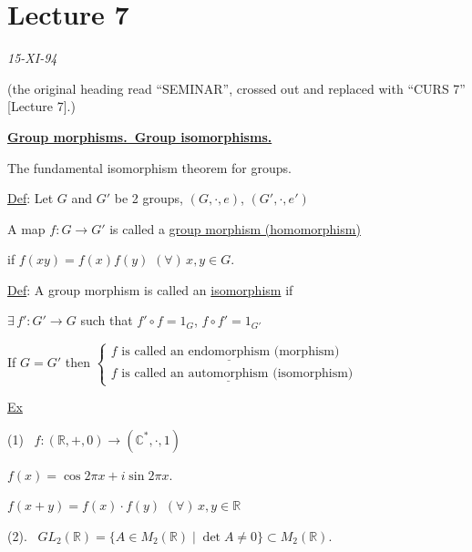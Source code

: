 \bigskip

\section{Lecture 7}



\begin{center}
\end{center}
\begin{flushright}
\textit{15-XI-94}
\end{flushright}
\noindent \footnotesize (the original heading read ``SEMINAR'', crossed out and replaced with ``CURS 7'' [Lecture 7].)\normalsize

\bigskip
\noindent\underline{\textbf{Group morphisms.\ Group isomorphisms.}}

\noindent The fundamental isomorphism theorem for groups.

\bigskip
\noindent\underline{Def}: Let $G$ and $G'$ be 2 groups, $(G,\cdot,e)$, $(G',\cdot,e')$

\noindent A map $f:G\to G'$ is called a \underline{group morphism (homomorphism)}

\noindent if $f(xy)=f(x)f(y)$ $(\forall)\,x,y\in G$.

\bigskip
\noindent\underline{Def}: A group morphism is called an \underline{isomorphism} if

\noindent $\exists\,f':G'\to G$ such that $f'\circ f=1_G$, $f\circ f'=1_{G'}$

\bigskip
\noindent If $G=G'$ then $\begin{cases} f \text{ is called an } \underline{\text{endomorphism}} \text{ (morphism)} \\ f \text{ is called an } \underline{\text{automorphism}} \text{ (isomorphism)}\end{cases}$

\bigskip
\noindent\underline{Ex}

\noindent (1) \ $f:(\mathbb{R},+,0) \to (\mathbb{C}^*,\cdot,1)$

\noindent $f(x) = \cos 2\pi x + i\sin 2\pi x$.

\noindent $f(x+y) = f(x)\cdot f(y)$ $(\forall)\,x,y\in\mathbb{R}$

\bigskip
\noindent (2). \ $GL_2(\mathbb{R}) = \{A\in M_2(\mathbb{R}) \mid \det A\neq 0\} \subset M_2(\mathbb{R})$.

